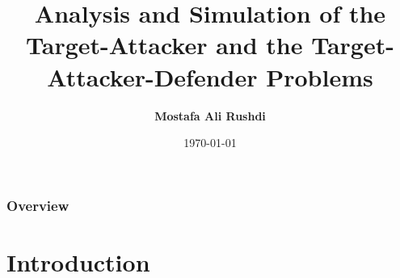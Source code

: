 \documentclass{beamer}
\title[MSc Presentation]{Analysis and Simulation of the Target-Attacker and the Target-Attacker-Defender Problems}
\author{\textbf{Mostafa Ali Rushdi}} %
\institute[Cairo University] %
{
Aerospace Engineering, Cairo University \\ %
\medskip
\medskip
\color{blue}\textbf{Prof. Ayman Hamdy Kasem} and \textbf{Prof. Gamal AlBayoumy}
}
\date{\today} %
\begin{document}
\begin{frame}
\titlepage %
\end{frame}

\begin{frame}
\frametitle{Overview} %
\tableofcontents %
\end{frame}



\section{Introduction} 

\end{document}
